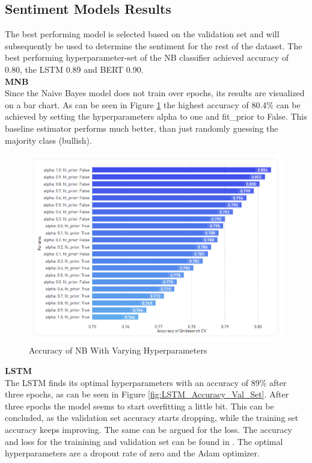 \documentclass[11pt, a4paper]{article}
\begin{document}
\subsection{Sentiment Models Results}
The best performing model is selected based on the validation set and will subsequently be used to determine the sentiment for the
rest of the dataset. The best performing hyperparameter-set of the NB classifier achieved accuracy of 0.80, the LSTM 0.89 and BERT 0.90. \\

\noindent\textbf{MNB}\\
Since the Naive Bayes model does not train over epochs, its results are visualized on a bar chart. As can be seen in Figure \ref{fig:nb_hyperparam} the
highest accuracy of 80.4\% can be achieved by setting the hyperparameters alpha to one and fit\_prior to False. This baseline estimator
performs much better, than just randomly guessing the majority class (bullish). \\

\begin{figure}[!htb]
    \centering
    \includegraphics[scale=0.43]{NB_hyperparam.png}
    \caption{Accuracy of NB With Varying Hyperparameters}
    \label{fig:nb_hyperparam}
\end{figure}

\newpage
\noindent\textbf{LSTM}\\
The LSTM finds its optimal hyperparameters with an accuracy of 89\% after three epochs, as can be seen in Figure \ref{fig:LSTM_Accuracy_Val_Set}.
After three epochs the model seems to start overfitting a little bit. This can be concluded, as the validation set accuracy starts dropping, while the training set
accuracy keeps improving. The same can be argued for the loss. The accuracy and loss for the trainining and validation set can be found in .
The optimal hyperparameters are a dropout rate of zero and the Adam optimizer. \\
\end{document}
